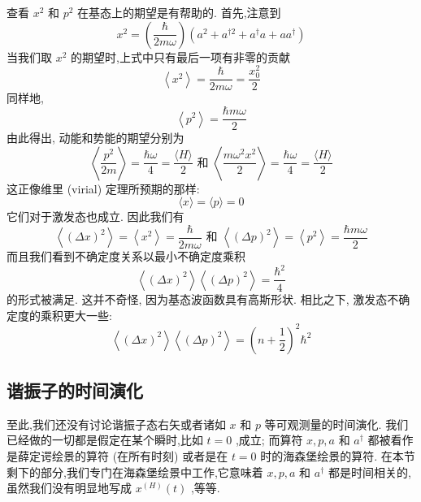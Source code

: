 查看 ${x}^{2}$ 和 ${p}^{2}$ 在基态上的期望是有帮助的. 首先,注意到
\begin{equation}
{x}^{2} = \left( \frac{\hbar }{2m\omega }\right) \left( {{a}^{2} + {a}^{\dagger 2} + {a}^{ \dagger }a + a{a}^{ \dagger }}\right)
\end{equation}
当我们取 ${x}^{2}$ 的期望时,上式中只有最后一项有非零的贡献
\begin{equation}
\left\langle {x}^{2}\right\rangle = \frac{\hbar }{2m\omega } = \frac{{x}_{0}^{2}}{2}
\end{equation}
同样地,
\begin{equation}
\left\langle {p}^{2}\right\rangle = \frac{\hbar {m\omega }}{2}
\end{equation}
由此得出, 动能和势能的期望分别为
\begin{equation}
\left\langle \frac{{p}^{2}}{2m}\right\rangle = \frac{\hbar \omega }{4} = \frac{\langle H\rangle }{2}\text{ 和 }\left\langle \frac{m{\omega }^{2}{x}^{2}}{2}\right\rangle = \frac{\hbar \omega }{4} = \frac{\langle H\rangle }{2}
\end{equation}
这正像维里 (virial) 定理所预期的那样:
\begin{equation}
\langle x\rangle = \langle p\rangle = 0
\end{equation}
它们对于激发态也成立. 因此我们有
\begin{equation}
\left\langle {\left( \Delta x\right) }^{2}\right\rangle = \left\langle {x}^{2}\right\rangle = \frac{\hbar }{2m\omega }\text{ 和 }\left\langle {\left( \Delta p\right) }^{2}\right\rangle = \left\langle {p}^{2}\right\rangle = \frac{\hbar {m\omega }}{2}
\end{equation}
而且我们看到不确定度关系以最小不确定度乘积
\begin{equation}
\left\langle {\left( \Delta x\right) }^{2}\right\rangle \left\langle {\left( \Delta p\right) }^{2}\right\rangle = \frac{{\hbar }^{2}}{4}
\end{equation}
的形式被满足. 这并不奇怪, 因为基态波函数具有高斯形状. 相比之下, 激发态不确定度的乘积更大一些:
\begin{equation}
\left\langle {\left( \Delta x\right) }^{2}\right\rangle \left\langle {\left( \Delta p\right) }^{2}\right\rangle = {\left( n + \frac{1}{2}\right) }^{2}{\hbar }^{2}
\end{equation}
\subsection{谐振子的时间演化}
至此,我们还没有讨论谐振子态右矢或者诸如 $x$ 和 $p$ 等可观测量的时间演化. 我们已经做的一切都是假定在某个瞬时,比如 $t = 0$ ,成立; 而算符 $x, p, a$ 和 ${a}^{ \dagger }$ 都被看作是薛定谔绘景的算符 (在所有时刻) 或者是在 $t = 0$ 时的海森堡绘景的算符. 在本节剩下的部分,我们专门在海森堡绘景中工作,它意味着 $x, p, a$ 和 ${a}^{ \dagger }$ 都是时间相关的,虽然我们没有明显地写成 ${x}^{\left( H\right) }\left( t\right)$ ,等等.

